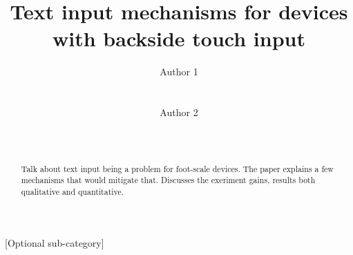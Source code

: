 \documentclass{chi2011}
\begin{document}
\setlength{\paperheight}{11in}
\setlength{\paperwidth}{8.5in}
\setlength{\pdfpageheight}{\paperheight}
\setlength{\pdfpagewidth}{\paperwidth}


\title{Text input mechanisms for devices with backside touch input}
\author{
  \alignauthor Author 1\\
    \\
    \\
  \alignauthor Author 2\\
    \\
    \\
}

\maketitle

\begin{abstract}
  Talk about text input being a problem for foot-scale devices. The paper explains a few mechanisms that would mitigate that. Discusses the exeriment gains, results both qualitative and quantitative.
\end{abstract}


[Optional sub-category]
























\end{document}
